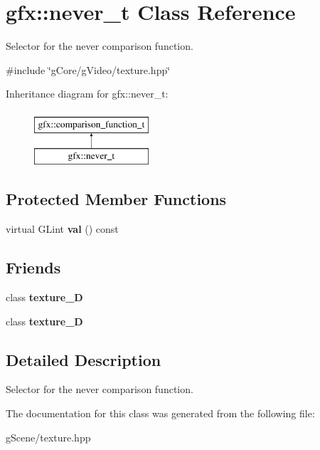 \hypertarget{classgfx_1_1never__t}{\section{gfx\-:\-:never\-\_\-t Class Reference}
\label{classgfx_1_1never__t}
}


Selector for the never comparison function.  




{\ttfamily \#include \char`\"{}g\-Core/g\-Video/texture.\-hpp\char`\"{}}

Inheritance diagram for gfx\-:\-:never\-\_\-t\-:\begin{figure}[H]
\begin{center}
\leavevmode
\includegraphics[height=2.000000cm]{classgfx_1_1never__t}
\end{center}
\end{figure}
\subsection*{Protected Member Functions}
\begin{DoxyCompactItemize}
\item 
\hypertarget{classgfx_1_1never__t_ab27939641421e1bfa55ae66314cad817}{virtual G\-Lint {\bfseries val} () const }\label{classgfx_1_1never__t_ab27939641421e1bfa55ae66314cad817}

\end{DoxyCompactItemize}
\subsection*{Friends}
\begin{DoxyCompactItemize}
\item 
\hypertarget{classgfx_1_1never__t_a2039d67f6166ccf823c78e3476aad9aa}{class {\bfseries texture\-\_\-D}}\label{classgfx_1_1never__t_a2039d67f6166ccf823c78e3476aad9aa}

\item 
\hypertarget{classgfx_1_1never__t_a22ad86ef46c3b17357a0cd59e50bc7dd}{class {\bfseries texture\-\_\-D}}\label{classgfx_1_1never__t_a22ad86ef46c3b17357a0cd59e50bc7dd}

\end{DoxyCompactItemize}


\subsection{Detailed Description}
Selector for the never comparison function. 

The documentation for this class was generated from the following file\-:\begin{DoxyCompactItemize}
\item 
g\-Scene/texture.\-hpp\end{DoxyCompactItemize}
